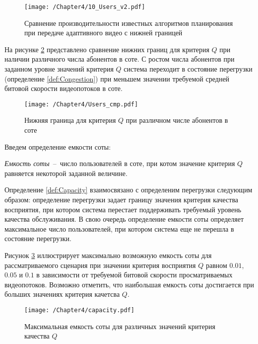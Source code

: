 \begin{figure}[htbp]
\begin{center}
\texttt{[image: /Chapter4/10\_Users\_v2.pdf]}
\caption{Сравнение производительности известных алгоритмов планирования при передаче адаптивного видео с нижней границей}
\label{fig:Q_PLOT}
\end{center}
\end{figure}

На рисунке \ref{fig:Users_cmp} представлено сравнение нижних границ для критерия $Q$ при наличии различного числа абонентов в соте. С ростом числа абонентов при заданном уровне значений критерия $Q$ система переходит в состояние перегрузки (определение \ref{def:Congestion}) при меньшем значении требуемой средней битовой скорости видеопотоков в соте.

\begin{figure}[htbp]
\begin{center}
\texttt{[image: /Chapter4/Users\_cmp.pdf]}
\caption{Нижняя граница для критерия $Q$ при различном числе абонентов в соте}
\label{fig:Users_cmp}
\end{center}
\end{figure}

Введем определение емкости соты:
\begin{definition}
\label{def:Capacity}
    \emph{Емкость соты}~--~число пользователей в соте, при котом значение критерия $Q$ равняется некоторой заданной величине.
\end{definition}
Определение \ref{def:Capacity} взаимосвязано с определеним перегрузки следующим образом: определение перегрузки задает границу значения критерия качества восприятия, при котором система перестает поддерживать требуемый уровень качества обслуживания. В свою очередь определение емкости соты определяет максимальное число пользователей, при котором система еще не перешла в состояние перегрузки.

Рисунок \ref{fig:capacity} иллюстрирует максимально возможную емкость соты для рассматриваемого сценария при значении критерия восприятия $Q$ равном $0.01$, $0.05$ и $0.1$ в зависимости от требуемой битовой скорости просматриваемых видеопотоков. Возможно отметить, что наибольшая емкость соты достигается при больших значениях критерия качетсва $Q$.

\begin{figure}[htbp]
\begin{center}
\texttt{[image: /Chapter4/capacity.pdf]}
\caption{Максимальная емкость соты для различных значений критерия качества $Q$}
\label{fig:capacity}
\end{center}
\end{figure}

